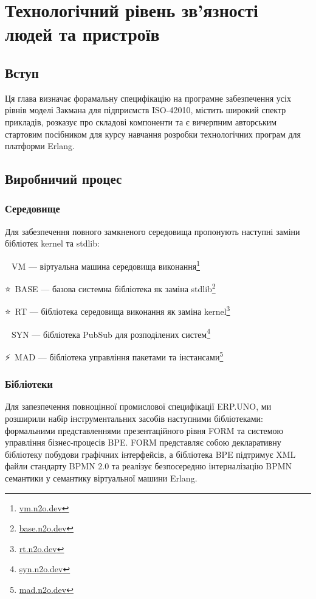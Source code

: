 \chapter{Технологічний рівень зв'язності людей та пристроїв}

\section{Вступ}

Ця глава визначає форамальну специфікацію на програмне забезпечення усіх рівнів моделі Закмана
для підприємств ISO-42010, містить широкий спектр прикладів, розказує про складові компоненти
та є вичерпним авторським стартовим посібником для курсу навчання розробки
технологічних програм для платформи Erlang.

\section{Виробничий процес}

\subsection{Середовище}

Для забезпечення повного замкненого середовища пропонують наступні заміни бібліотек kernel та stdlib:

\setmainfont{Segoe UI Emoji}🚀\setmainfont{Geometria}\ VM --- віртуальна машина середовища виконання\footnote{\url{vm.n2o.dev}}

\setmainfont{Segoe UI Emoji}⭐\setmainfont{Geometria}\ BASE --- базова системна бібліотека як заміна stdlib\footnote{\url{base.n2o.dev}}

\setmainfont{Segoe UI Emoji}⭐\setmainfont{Geometria}\ RT --- бібліотека середовища виконання як заміна kernel\footnote{\url{rt.n2o.dev}}

\setmainfont{Segoe UI Emoji}📨\setmainfont{Geometria}\ SYN --- бібліотека PubSub для розподілених систем\footnote{\url{syn.n2o.dev}}

\setmainfont{Segoe UI Emoji}⚡\setmainfont{Geometria}\ MAD --- бібліотека управління пакетами та інстансами\footnote{\url{mad.n2o.dev}}

\newpage
\subsection{Бібліотеки}

Для запезпечення повноцінної промислової специфікації ERP.UNO, ми розширили
набір інструментальних засобів наступними бібліотеками: формальними представленнями
презентаційного рівня FORM та системою управління бізнес-процесів BPE. FORM представляє
собою декларативну бібліотеку побудови графічних інтерфейсів, а бібліотека BPE
підтримує XML файли стандарту BPMN 2.0 та реалізує безпосередню інтерналізацію
BPMN семантики у семантику віртуальної машини Erlang.

